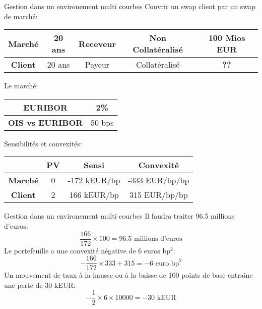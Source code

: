 \documentclass{beamer}
\begin{document}
\begin{frame}{Gestion dans un environement multi courbes}
\small
Couvrir un swap client par un swap de marché:\\
\begin{center}
\begin{tabular}{|c|c|c|c|c|}
\hline
\textbf{Marché} &20 ans&Receveur&Non Collatéralisé&100 Mios EUR \\ 
\hline
\textbf{Client} &20 ans&Payeur&Collatéralisé&\textbf{??} \\ 
\hline
\end{tabular}
\end{center}
Le marché:\\
\begin{center}
\begin{tabular}{|c|c|}
\hline
\textbf{EURIBOR} & 2\% \\
\hline
\textbf{OIS vs EURIBOR} & 50 bps \\
\hline
\end{tabular}
\end{center}
Sensibilités et convexités:
\begin{center}
\begin{tabular}{|c|c|c|c|}
\hline
&\textbf{PV}&\textbf{Sensi}& \textbf{Convexité}  \\ 
\hline
\textbf{Marché} & 0&-172 kEUR/bp&-333 EUR/bp/bp \\ 
\hline
\textbf{Client} & 2&166 kEUR/bp&315 EUR/bp/bp \\ 
\hline
\end{tabular}
\end{center}

\end{frame}
\begin{frame}{Gestion dans un environement multi courbes}
Il faudra traiter 96.5 millions d'euros:\\
\[
\frac{166}{172} \times 100 = 96.5 \text{ millions d'euros}
\]  
Le portefeuille a une convexité négative de 6 euros bp$^2$:\\
\[
- \frac{166}{172} \times 333 + 315 = -6 \text{ euro bp}^2 
\]
Un mouvement de taux à la hausse ou à la baisse de 100 points de base entraine une perte de 30 kEUR:\\
\[
- \frac{1}{2} \times 6 \times 10000 = -30\text{ kEUR}  
\]
\end{frame}
\end{document}
